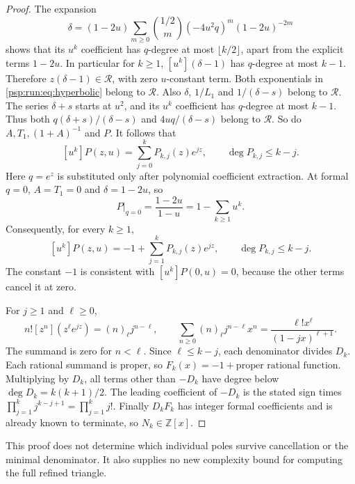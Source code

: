 \documentclass[11pt,letterpaper]{article}
\numberwithin{equation}{section}
\theoremstyle{remark}\newtheorem{remark}[theorem]{Remark}
\begin{document}
\begin{proof}
The expansion
\[
 \delta=(1-2u)\sum_{m\geq0}\binom{1/2}{m}
           (-4u^2q)^m(1-2u)^{-2m}
\]
shows that its $u^k$ coefficient has $q$-degree at most $\lfloor k/2\rfloor$,
apart from the explicit terms $1-2u$. In particular for $k\geq1$,
$[u^k](\delta-1)$ has $q$-degree at most $k-1$. Therefore
$z(\delta-1)\in\mathcal R$, with zero $u$-constant term. Both
exponentials in \eqref{psp:run:eq:hyperbolic} belong to $\mathcal R$.
Also $\delta$, $1/L_1$ and $1/(\delta-s)$ belong to $\mathcal R$.
The series $\delta+s$ starts at $u^2$, and its $u^k$ coefficient has
$q$-degree at most $k-1$. Thus both $q(\delta+s)/(\delta-s)$ and
$4uq/(\delta-s)$ belong to $\mathcal R$. So do $A,T_1,(1+A)^{-1}$ and $P$.
It follows that
\[
 [u^k]P(z,u)=\sum_{j=0}^k P_{k,j}(z)e^{jz},\qquad
 \deg P_{k,j}\leq k-j.
\]
Here $q=e^z$ is substituted only after polynomial coefficient extraction.
At formal $q=0$, $A=T_1=0$ and $\delta=1-2u$, so
\[
 P|_{q=0}=\frac{1-2u}{1-u}=1-\sum_{k\geq1}u^k.
\]
Consequently, for every $k\geq1$,
\begin{equation}\label{psp:run:eq:expopoly}
 [u^k]P(z,u)=-1+\sum_{j=1}^kP_{k,j}(z)e^{jz},\qquad
 \deg P_{k,j}\leq k-j.
\end{equation}
The constant $-1$ is consistent with $[u^k]P(0,u)=0$, because the other
terms cancel it at zero.

For $j\geq1$ and $\ell\geq0$,
\[
 n![z^n](z^\ell e^{jz})=(n)_\ell j^{n-\ell},\qquad
 \sum_{n\geq0}(n)_\ell j^{n-\ell}x^n
      =\frac{\ell!x^\ell}{(1-jx)^{\ell+1}}.
\]
The summand is zero for $n<\ell$. Since $\ell\leq k-j$, each denominator
divides $D_k$. Each rational summand is proper, so
$F_k(x)=-1+\text{proper rational function}$. Multiplying by $D_k$,
all terms other than $-D_k$ have degree below
$\deg D_k=k(k+1)/2$. The leading coefficient of $-D_k$ is the stated
sign times $\prod_{j=1}^k j^{k-j+1}=\prod_{j=1}^k j!$.
Finally $D_kF_k$ has integer formal coefficients and is already known
to terminate, so $N_k\in\mathbb Z[x]$.
\end{proof}
This proof does not determine which individual poles survive
cancellation or the minimal denominator. It also supplies no new
complexity bound for computing the full refined triangle.
\end{document}
